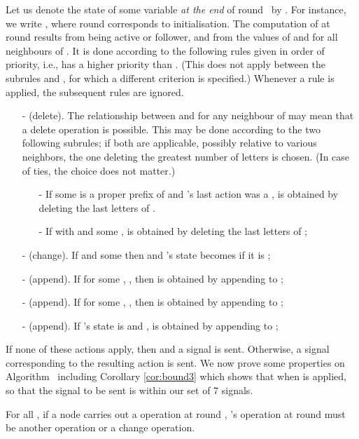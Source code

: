 \documentclass[11pt,envcountsame,letterpaper]{llncs}
\begin{document}
Let us denote the state of some variable  {\em at the end} of round~ by . For instance, we write , where round  corresponds to initialisation.
The computation of  at round  results from  being active or follower, and from the values of 
  and  for all neighbours  of . 
It is done according to the following rules given in order of 
priority, i.e.,  has a higher priority than 
. 
(This does not apply between the subrules  and , for which a different criterion is specified.)
Whenever a rule is applied, the subsequent rules are ignored.
\begin{itemize}
\item[-] (delete). The relationship between  and  
for any neighbour
 of  may mean that a delete operation is possible. This may be done according to the two following subrules; if both are applicable, possibly relative to various neighbors, the one deleting the greatest number of letters is chosen. (In case of ties, the choice does not matter.)
\begin{itemize} 
\item[-] If some  is a proper prefix of  and 's 
last action was a ,
 is obtained by deleting the last 
letters of .
\item[-] If  with  and some , 
 is obtained by deleting the last
 letters of ;
\end{itemize}
\item[-] (change). If  and some  then     and
's state becomes     if it is ;

\item[-] (append). If  for some , , then
 is obtained by appending  to ; 
\item[-] (append). If for some ,  , then
 is obtained by appending  to ;
\item[-] (append). If 's state is  and ,
 is obtained by
appending  to ;
\end{itemize}

If none of these actions apply, then  and a  signal is sent. Otherwise, a signal corresponding to the resulting action is sent.
We now prove some properties on Algorithm~ including Corollary \ref{cor:bound3}
which shows that when  is applied,  so that the signal to be sent
is within our set of 7 signals.


\begin{lemma}
\label{lem:delete}
For all , if a node  carries out a  operation at round ,
's operation at round  must be another  operation
or a change operation.
\end{lemma}
\end{document}
